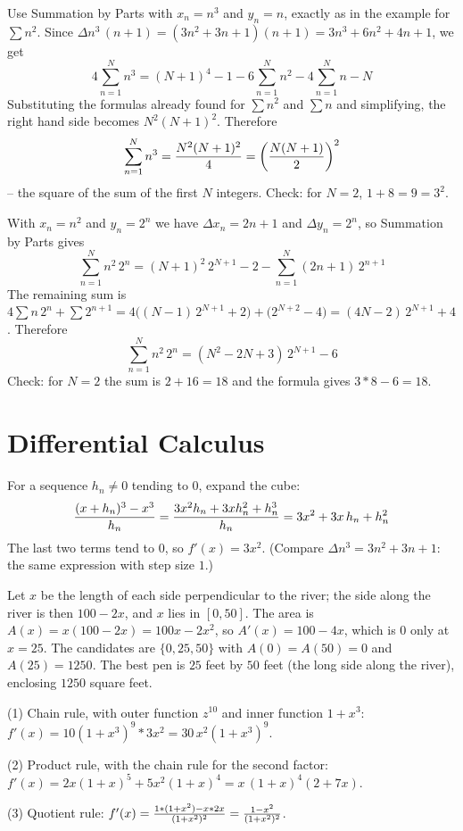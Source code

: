  Use Summation by Parts with $x_n = n^3$ and $y_n = n$, exactly as in
the example for $\sum n^2$. Since $\Delta n^3 \, (n+1) = (3n^2 + 3n + 1)(n+1) =
3n^3 + 6n^2 + 4n + 1$, we get
$$
4 \sum_{n=1}^N n^3 = (N+1)^4 - 1 - 6 \sum_{n=1}^N n^2 - 4 \sum_{n=1}^N n - N
$$
Substituting the formulas already found for $\sum n^2$ and $\sum n$ and
simplifying, the right hand side becomes $N^2 (N+1)^2$. Therefore
$$
\sum_{n=1}^N n^3 = {N^2 (N+1)^2 \over 4} = \biggl( {N(N+1) \over 2} \biggr)^2
$$
-- the square of the sum of the first $N$ integers. Check: for $N = 2$,
$1 + 8 = 9 = 3^2$.

 With $x_n = n^2$ and $y_n = 2^n$ we have $\Delta x_n = 2n + 1$ and
$\Delta y_n = 2^n$, so Summation by Parts gives
$$
\sum_{n=1}^N n^2 \, 2^n = (N+1)^2 \, 2^{N+1} - 2 - \sum_{n=1}^N (2n+1)\, 2^{n+1}
$$
The remaining sum is $4 \sum n\, 2^n + \sum 2^{n+1} =
4\bigl((N-1)\,2^{N+1} + 2\bigr) + \bigl(2^{N+2} - 4\bigr) = (4N - 2)\, 2^{N+1} + 4$.
Therefore
$$
\sum_{n=1}^N n^2 \, 2^n = (N^2 - 2N + 3)\, 2^{N+1} - 6
$$
Check: for $N = 2$ the sum is $2 + 16 = 18$ and the formula gives
$3 * 8 - 6 = 18$.

\section{Differential Calculus}

 For a sequence $h_n \ne 0$ tending to $0$, expand the cube:
$$
{(x + h_n)^3 - x^3 \over h_n} = {3x^2 h_n + 3x h_n^2 + h_n^3 \over h_n}
= 3x^2 + 3x\, h_n + h_n^2
$$
The last two terms tend to $0$, so $f'(x) = 3x^2$. (Compare
$\Delta n^3 = 3n^2 + 3n + 1$: the same expression with step size $1$.)

 Let $x$ be the length of each side perpendicular to the river; the
side along the river is then $100 - 2x$, and $x$ lies in $[0, 50]$. The
area is $A(x) = x(100 - 2x) = 100x - 2x^2$, so $A'(x) = 100 - 4x$, which
is $0$ only at $x = 25$. The candidates are $\{0, 25, 50\}$ with
$A(0) = A(50) = 0$ and $A(25) = 1250$. The best pen is $25$ feet by $50$
feet (the long side along the river), enclosing $1250$ square feet.

 (1) Chain rule, with outer function $z^{10}$ and inner function
$1 + x^3$: $f'(x) = 10 (1 + x^3)^9 * 3x^2 = 30\, x^2 (1 + x^3)^9$.

\noindent (2) Product rule, with the chain rule for the second factor:
$f'(x) = 2x (1+x)^5 + 5x^2 (1+x)^4 = x\,(1+x)^4 (2 + 7x)$.

\noindent (3) Quotient rule:
$f'(x) = {1 * (1 + x^2) - x * 2x \over (1 + x^2)^2} = {1 - x^2 \over (1 + x^2)^2}$.

